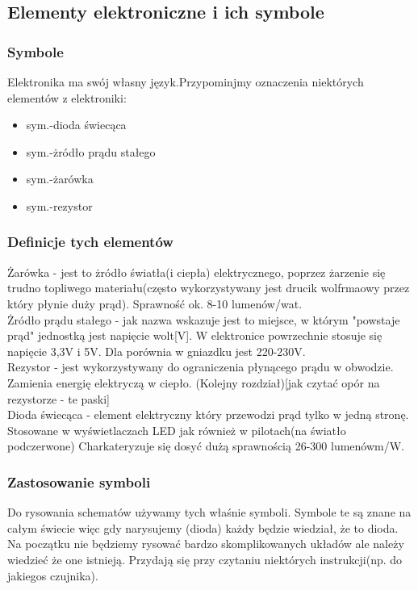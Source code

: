 	\subsection{Elementy elektroniczne i ich symbole}
	\subsubsection {Symbole}
	Elektronika ma swój własny język.Przypominjmy oznaczenia niektórych elementów z elektroniki:
\begin{itemize}
	\item sym.-dioda świecąca
	\item sym.-żródło prądu stałego
	\item sym.-żarówka
	\item sym.-rezystor
\end{itemize}
   \subsubsection{Definicje tych elementów}
Żarówka - jest to żródło światła(i ciepła) elektrycznego, poprzez żarzenie się trudno topliwego materiału(często wykorzystywany jest drucik wolfrmaowy przez który płynie duży prąd). Sprawność ok.
8-10 lumenów/wat. 
\\Żródło prądu stałego - jak nazwa wskazuje jest to miejsce, w którym "powstaje prąd" jednostką jest napięcie wolt[V]. W elektronice powrzechnie stosuje się napięcie 3,3V i 5V. Dla porównia w gniazdku jest 220-230V.
\\ Rezystor - jest wykorzystywany do ograniczenia płynącego prądu w obwodzie. Zamienia energię elektryczą w ciepło. (Kolejny rozdział)[jak czytać opór na rezystorze - te paski]
\\ Dioda świecąca - element elektryczny który przewodzi prąd tylko w jedną stronę. Stosowane w wyświetlaczach LED jak również w pilotach(na światło podczerwone) Charkateryzuje się dosyć dużą sprawnością 26-300 lumenówm/W. 

\subsubsection{Zastosowanie symboli}
    
Do rysowania schematów używamy tych właśnie symboli. Symbole te są znane na całym świecie więc gdy narysujemy (dioda) każdy będzie wiedział, że to dioda. Na początku nie będziemy rysować bardzo skomplikowanych układów ale należy wiedzieć że one istnieją. Przydają się przy czytaniu niektórych instrukcji(np. do jakiegos czujnika).

